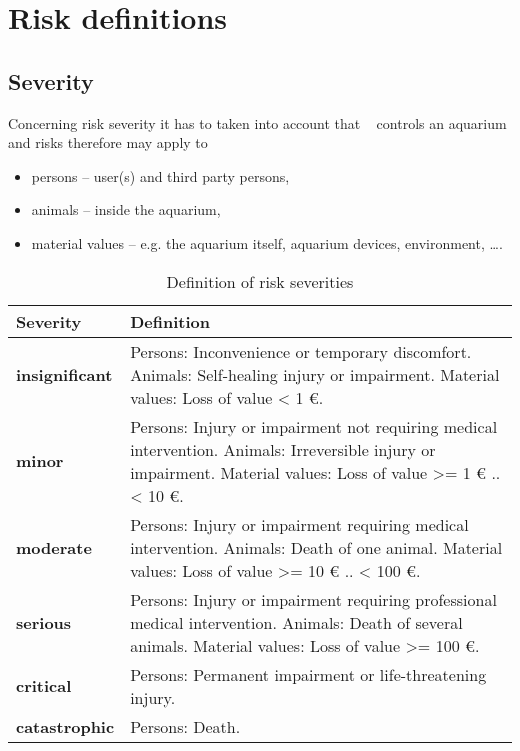 \section{Risk definitions}

\subsection{Severity}
Concerning risk severity it has to taken into account that \ThisProjectName~ controls an aquarium and risks therefore may apply to 
\begin{itemize}
  \item persons -- user(s) and third party persons,
  \item animals -- inside the aquarium,
  \item material values -- e.g. the aquarium itself, aquarium devices, environment, \dots.
\end{itemize}

\begin{table}[H]
  \begin{tabularx}{\textwidth}{|l|X|}
    \hline
    \textbf{Severity} & \textbf{Definition} \\
    \hline
    \textbf{insignificant} & Persons: Inconvenience or temporary discomfort. \newline
    Animals: Self-healing injury or impairment. \newline
    Material values: Loss of value \textless{} 1 \euro. \\
    \hline
    \textbf{minor} & Persons: Injury or impairment not requiring medical intervention. \newline
    Animals: Irreversible injury or impairment.\newline
    Material values: Loss of value \textgreater= 1 \euro{} .. \textless{} 10 \euro. \\
    \hline
    \textbf{moderate} & Persons: Injury or impairment requiring medical intervention. \newline
    Animals: Death of one animal. \newline
    Material values: Loss of value \textgreater= 10 \euro{} .. \textless{} 100 \euro. \\
    \hline
    \textbf{serious} & Persons: Injury or impairment requiring professional medical intervention. \newline
    Animals: Death of several animals. \newline
    Material values: Loss of value \textgreater= 100 \euro. \\
    \hline
    \textbf{critical} & Persons: Permanent impairment or life-threatening injury. \\
    \hline
    \textbf{catastrophic} & Persons: Death.\\
    \hline
  \end{tabularx}
  \caption{Definition of risk severities}
\end{table}


